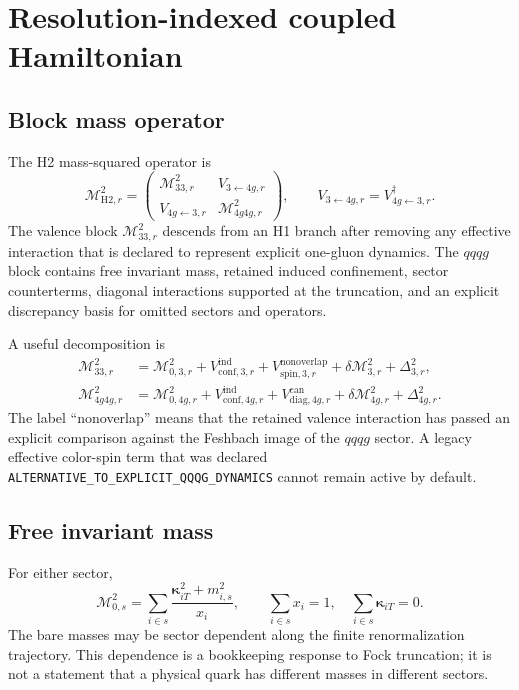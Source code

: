 \documentclass[11pt]{article}
\newcommand{\cM}{\mathcal M}
\newcommand{\ind}{\mathrm{ind}}
\begin{document}
\section{Resolution-indexed coupled Hamiltonian}

\subsection{Block mass operator}

The H2 mass-squared operator is
\begin{equation}
 \cM_{\mathrm{H2},r}^{2}
 =
 \begin{pmatrix}
  \cM_{33,r}^{2} & V_{3\leftarrow4g,r}\\
  V_{4g\leftarrow3,r} & \cM_{4g4g,r}^{2}
 \end{pmatrix},
 \qquad
 V_{3\leftarrow4g,r}=V_{4g\leftarrow3,r}^{\dagger}.
 \label{eq:block-h2}
\end{equation}
The valence block \(\cM_{33,r}^{2}\) descends from an H1 branch after removing
any effective interaction that is declared to represent explicit one-gluon
dynamics.  The \(qqqg\) block contains free invariant mass, retained induced
confinement, sector counterterms, diagonal interactions supported at the
truncation, and an explicit discrepancy basis for omitted sectors and
operators.

A useful decomposition is
\begin{align}
 \cM_{33,r}^{2}
 &={}
 \cM_{0,3,r}^{2}
 +V_{\mathrm{conf},3,r}^{\ind}
 +V_{\mathrm{spin},3,r}^{\mathrm{nonoverlap}}
 +\delta\cM_{3,r}^{2}
 +\Delta_{3,r}^{2},
 \\
 \cM_{4g4g,r}^{2}
 &={}
 \cM_{0,4g,r}^{2}
 +V_{\mathrm{conf},4g,r}^{\ind}
 +V_{\mathrm{diag},4g,r}^{\mathrm{can}}
 +\delta\cM_{4g,r}^{2}
 +\Delta_{4g,r}^{2}.
\end{align}
The label ``nonoverlap'' means that the retained valence interaction has passed
an explicit comparison against the Feshbach image of the \(qqqg\) sector.  A
legacy effective color-spin term that was declared
\texttt{ALTERNATIVE\_TO\_EXPLICIT\_QQQG\_DYNAMICS} cannot remain active by
default.

\subsection{Free invariant mass}

For either sector,
\begin{equation}
 \cM_{0,s}^{2}
 =
 \sum_{i\in s}
 \frac{\bm\kappa_{iT}^{2}+m_{i,s}^{2}}{x_i},
 \qquad
 \sum_{i\in s}x_i=1,
 \quad
 \sum_{i\in s}\bm\kappa_{iT}=0.
\end{equation}
The bare masses may be sector dependent along the finite renormalization
trajectory.  This dependence is a bookkeeping response to Fock truncation; it
is not a statement that a physical quark has different masses in different
sectors.
\end{document}
